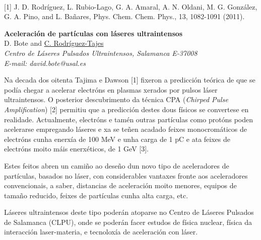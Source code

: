 \\
{\footnotesize
[1] J. D. Rodríguez, L. Rubio-Lago, G. A. Amaral, A. N. Oldani, M. G. González, G. A. Pino, and L.
Bañares, Phys. Chem. Chem. Phys., 13, 1082-1091 (2011).
}
\newpage
\setcounter{figure}{0}
\begin{center}
{\bf \Large
Aceleración de partículas con láseres ultraintensos
}
\\
\vspace{0.5cm}
D. Bote and \underline{C. Rodríguez-Tajes}
\\
\vspace{0.5cm}
{\it
Centro de Láseres Pulsados Ultraintensos, Salamanca E-37008
}
\\
\vspace{0.5cm}
{\it E-mail: david.bote@usal.es}
\\
\vspace{0.5cm}
\end{center}
Na decada dos oitenta Tajima e Dawson [1] fixeron a predicción teórica de
que se podía chegar a acelerar electróns en plasmas xerados por pulsos láser
ultraintensos. O posterior descubrimento da técnica CPA (\textit{Chirped Pulse
Amplification}) [2] permitiu que a predicción destes dous físicos se convertese en
realidade. Actualmente, electróns e tamén outras partículas como protóns poden
acelerarse empregando láseres e xa se teñen acadado feixes monocromáticos de
electróns cunha enerxía de 100 MeV e unha carga de 1 pC e ata feixes de electróns
moito máis enerxéticos, de 1 GeV [3].

Estes feitos abren un camiño ao deseño dun novo tipo de aceleradores de
partículas, basados no láser, con considerables vantaxes fronte aos aceleradores
convencionais, a saber, distancias de aceleración moito menores, equipos de tamaño
reducido, feixes de partículas cunha alta carga, etc.

Láseres ultraintensos deste tipo poderán atoparse no Centro de Láseres
Pulsados de Salamanca (CLPU), onde se poderán facer estudos de física nuclear,
física da interacción laser-materia, e tecnoloxía de aceleración con láser.


